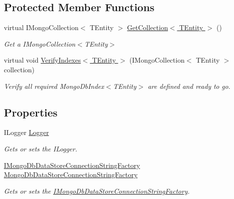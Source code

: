 \subsection*{Protected Member Functions}
\begin{DoxyCompactItemize}
\item 
virtual I\+Mongo\+Collection$<$ T\+Entity $>$ \hyperlink{classCqrs_1_1MongoDB_1_1Factories_1_1MongoDbDataStoreFactory_ab1b732065a4369b09851119969a4815f_ab1b732065a4369b09851119969a4815f}{Get\+Collection$<$ T\+Entity $>$} ()
\begin{DoxyCompactList}\small\item\em Get a I\+Mongo\+Collection$<$\+T\+Entity$>$ \end{DoxyCompactList}\item 
virtual void \hyperlink{classCqrs_1_1MongoDB_1_1Factories_1_1MongoDbDataStoreFactory_a1be5e7f0670e120c5105ff96d9ce9f82_a1be5e7f0670e120c5105ff96d9ce9f82}{Verify\+Indexes$<$ T\+Entity $>$} (I\+Mongo\+Collection$<$ T\+Entity $>$ collection)
\begin{DoxyCompactList}\small\item\em Verify all required Mongo\+Db\+Index$<$\+T\+Entity$>$ are defined and ready to go. \end{DoxyCompactList}\end{DoxyCompactItemize}
\subsection*{Properties}
\begin{DoxyCompactItemize}
\item 
I\+Logger \hyperlink{classCqrs_1_1MongoDB_1_1Factories_1_1MongoDbDataStoreFactory_a2756ef3d362bd2c95193e113fa6f9e6d_a2756ef3d362bd2c95193e113fa6f9e6d}{Logger}
\begin{DoxyCompactList}\small\item\em Gets or sets the I\+Logger. \end{DoxyCompactList}\item 
\hyperlink{interfaceCqrs_1_1MongoDB_1_1Factories_1_1IMongoDbDataStoreConnectionStringFactory}{I\+Mongo\+Db\+Data\+Store\+Connection\+String\+Factory} \hyperlink{classCqrs_1_1MongoDB_1_1Factories_1_1MongoDbDataStoreFactory_aa19c3db791da60ae4d91a1c667549de7_aa19c3db791da60ae4d91a1c667549de7}{Mongo\+Db\+Data\+Store\+Connection\+String\+Factory}
\begin{DoxyCompactList}\small\item\em Gets or sets the \hyperlink{interfaceCqrs_1_1MongoDB_1_1Factories_1_1IMongoDbDataStoreConnectionStringFactory}{I\+Mongo\+Db\+Data\+Store\+Connection\+String\+Factory}. \end{DoxyCompactList}\end{DoxyCompactItemize}


